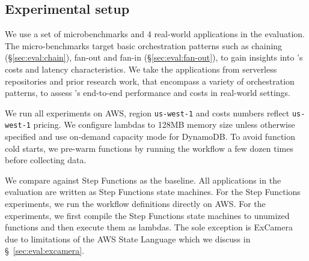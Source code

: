 



\subsection{Experimental setup}

We use a set of microbenchmarks and 4 real-world applications in the
evaluation. The micro-benchmarks target basic orchestration patterns such as
chaining (\S\ref{sec:eval:chain}), fan-out and fan-in
(\S\ref{sec:eval:fan-out}), to gain insights into \name{}'s costs and latency
characteristics. We take the applications from serverless repositories and
prior research work, that encompass a variety of orchestration patterns, to
assess \name{}'s end-to-end performance and costs in real-world settings.

We run all experiments on AWS, region \texttt{us-west-1} and costs numbers
reflect \texttt{us-west-1} pricing. We configure lambdas to 128MB memory size
unless otherwise specified and use on-demand capacity mode for DynamoDB. To
avoid function cold starts, we pre-warm functions by running the workflow a
few dozen times before collecting data.


We compare against Step Functions as the baseline. All applications in the
evaluation are written as Step Functions state machines. For the Step
Functions experiments, we run the workflow definitions directly on AWS. For
the \name{} experiments, we first compile the Step Functions state machines to
unumized functions and then execute them as lambdas. The sole exception is
ExCamera due to limitations of the AWS State Language which we discuss in
\S~\ref{sec:eval:excamera}.

